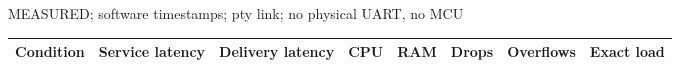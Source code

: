 \par\noindent MEASURED; software timestamps; pty link; no physical UART, no MCU\par
\begin{tabular}{llllllll}
\toprule
Condition & Service latency & Delivery latency & CPU & RAM & Drops & Overflows & Exact load \\
\midrule
\bottomrule
\end{tabular}

